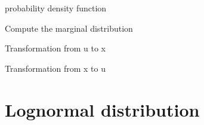 \documentclass[letterpaper,10pt,english]{sphinxmanual}
\begin{document}
\begin{fulllineitems}
\begin{fulllineitems}
probability density function

\end{fulllineitems}



\begin{fulllineitems}
Compute the marginal distribution

\end{fulllineitems}



\begin{fulllineitems}
Transformation from u to x

\end{fulllineitems}



\begin{fulllineitems}
Transformation from x to u

\end{fulllineitems}


\end{fulllineitems}



\section{Lognormal distribution}
\label{distributions:lognormal-distribution}
\end{document}
